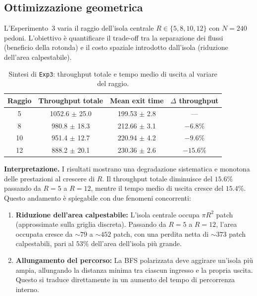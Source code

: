 \subsection{Ottimizzazione geometrica}
L'Esperimento~3 varia il raggio dell'isola centrale $R \in \{5, 8, 10, 12\}$ con $N = 240$ pedoni. L'obiettivo è quantificare il trade-off tra la separazione dei flussi (beneficio della rotonda) e il costo spaziale introdotto dall'isola (riduzione dell'area calpestabile).

\begin{table}[H]
\centering
\caption{Sintesi di \texttt{Exp3}: throughput totale e tempo medio di uscita al variare del raggio.}
\label{tab:exp3}
\begin{tabular}{cccc}
\toprule
Raggio & Throughput totale & Mean exit time & $\Delta$ throughput \\
\midrule
5  & 1052.6 $\pm$ 25.0 & 199.53 $\pm$ 2.8 & --- \\
8  & 980.8 $\pm$ 18.3  & 212.66 $\pm$ 3.1 & $-6.8\%$ \\
10 & 951.4 $\pm$ 12.7  & 220.94 $\pm$ 4.2 & $-9.6\%$ \\
12 & 888.2 $\pm$ 20.1  & 230.36 $\pm$ 2.6 & $-15.6\%$ \\
\bottomrule
\end{tabular}
\end{table}

\textbf{Interpretazione.} I risultati mostrano una degradazione sistematica e monotona delle prestazioni al crescere di $R$. Il throughput totale diminuisce del $15.6\%$ passando da $R=5$ a $R=12$, mentre il tempo medio di uscita cresce del $15.4\%$. Questo andamento è spiegabile con due fenomeni concorrenti:

\begin{enumerate}
    \item \textbf{Riduzione dell'area calpestabile:} L'isola centrale occupa $\pi R^2$ patch (approssimate sulla griglia discreta). Passando da $R=5$ a $R=12$, l'area occupata cresce da $\sim 79$ a $\sim 452$ patch, con una perdita netta di $\sim 373$ patch calpestabili, pari al $53\%$ dell'area dell'isola più grande.
    
    \item \textbf{Allungamento del percorso:} La BFS polarizzata deve aggirare un'isola più ampia, allungando la distanza minima tra ciascun ingresso e la propria uscita. Questo si traduce direttamente in un aumento del tempo di percorrenza interno.
\end{enumerate}


